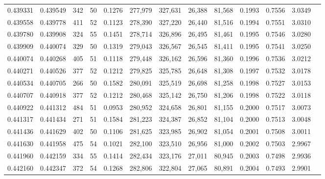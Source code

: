 \begin{tabular}{rrrrrrrrrrrrr}
0.439331 & 0.439549 &   342 &  50 &                                     0.1276 & 277,979 & 327,631 &  26,388 &  81,568 & 0.1993 & 0.7556 & 3.0349 \\
0.439558 & 0.439778 &   411 &  52 &                                     0.1123 & 278,390 & 327,220 &  26,440 &  81,516 & 0.1994 & 0.7551 & 3.0310 \\
0.439780 & 0.439908 &   324 &  55 &                                     0.1451 & 278,714 & 326,896 &  26,495 &  81,461 & 0.1995 & 0.7546 & 3.0280 \\
0.439909 & 0.440074 &   329 &  50 &                                     0.1319 & 279,043 & 326,567 &  26,545 &  81,411 & 0.1995 & 0.7541 & 3.0250 \\
0.440074 & 0.440268 &   405 &  51 &                                     0.1118 & 279,448 & 326,162 &  26,596 &  81,360 & 0.1996 & 0.7536 & 3.0212 \\
0.440271 & 0.440526 &   377 &  52 &                                     0.1212 & 279,825 & 325,785 &  26,648 &  81,308 & 0.1997 & 0.7532 & 3.0178 \\
0.440534 & 0.440705 &   266 &  50 &                                     0.1582 & 280,091 & 325,519 &  26,698 &  81,258 & 0.1998 & 0.7527 & 3.0153 \\
0.440707 & 0.440918 &   377 &  52 &                                     0.1212 & 280,468 & 325,142 &  26,750 &  81,206 & 0.1998 & 0.7522 & 3.0118 \\
0.440922 & 0.441312 &   484 &  51 &                                     0.0953 & 280,952 & 324,658 &  26,801 &  81,155 & 0.2000 & 0.7517 & 3.0073 \\
0.441317 & 0.441434 &   271 &  51 &                                     0.1584 & 281,223 & 324,387 &  26,852 &  81,104 & 0.2000 & 0.7513 & 3.0048 \\
0.441436 & 0.441629 &   402 &  50 &                                     0.1106 & 281,625 & 323,985 &  26,902 &  81,054 & 0.2001 & 0.7508 & 3.0011 \\
0.441630 & 0.441958 &   475 &  54 &                                     0.1021 & 282,100 & 323,510 &  26,956 &  81,000 & 0.2002 & 0.7503 & 2.9967 \\
0.441960 & 0.442159 &   334 &  55 &                                     0.1414 & 282,434 & 323,176 &  27,011 &  80,945 & 0.2003 & 0.7498 & 2.9936 \\
0.442160 & 0.442347 &   372 &  54 &                                     0.1268 & 282,806 & 322,804 &  27,065 &  80,891 & 0.2004 & 0.7493 & 2.9901 \\

\end{tabular}

